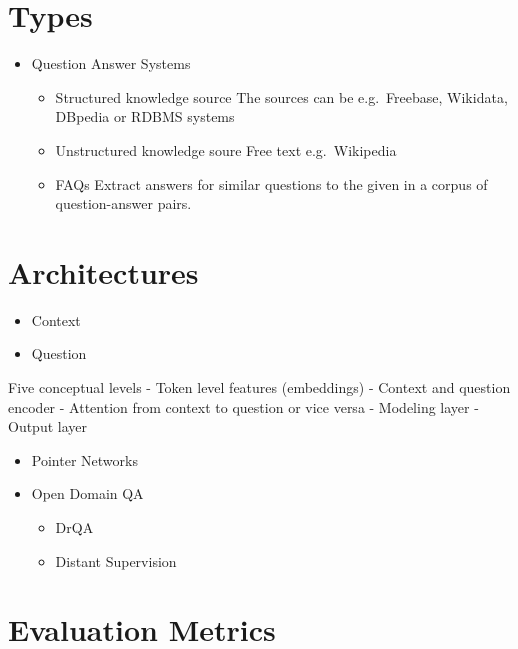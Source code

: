 \documentclass[]{krantz}
\providecommand{\tightlist}{%
  \setlength{\itemsep}{0pt}\setlength{\parskip}{0pt}}
\begin{document}
\hypertarget{types}{%
\section{Types}\label{types}}

\begin{itemize}
\tightlist
\item
  Question Answer Systems

  \begin{itemize}
  \tightlist
  \item
    Structured knowledge source
    The sources can be e.g.~Freebase, Wikidata, DBpedia or RDBMS systems
  \item
    Unstructured knowledge soure
    Free text e.g.~Wikipedia
  \item
    FAQs
    Extract answers for similar questions to the given in a corpus of question-answer pairs.
  \end{itemize}
\end{itemize}

\hypertarget{architectures}{%
\section{Architectures}\label{architectures}}

\begin{itemize}
\tightlist
\item
  Context
\item
  Question
\end{itemize}

Five conceptual levels
- Token level features (embeddings)
- Context and question encoder
- Attention from context to question or vice versa
- Modeling layer
- Output layer

\begin{itemize}
\item
  Pointer Networks
\item
  Open Domain QA

  \begin{itemize}
  \tightlist
  \item
    DrQA
  \item
    Distant Supervision
  \end{itemize}
\end{itemize}

\hypertarget{evaluation-metrics}{%
\section{Evaluation Metrics}\label{evaluation-metrics}}
\end{document}
